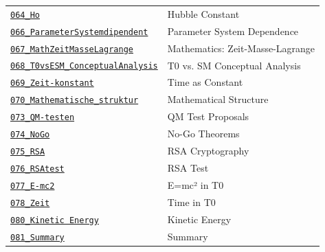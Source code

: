 {\begin{longtable}{@{}>{\raggedright\arraybackslash}p{} >{\raggedright\arraybackslash}p{}@{}}
\href{https://github.com/jpascher/T0-Time-Mass-Duality/blob/main/2/pdf/064_Ho_De.pdf}{\texttt{064\_Ho}} & Hubble Constant \\
\href{https://github.com/jpascher/T0-Time-Mass-Duality/blob/main/2/pdf/066_ParameterSystemdipendent_De.pdf}{\texttt{066\_ParameterSystemdipendent}} & Parameter System Dependence \\
\href{https://github.com/jpascher/T0-Time-Mass-Duality/blob/main/2/pdf/067_MathZeitMasseLagrange_De.pdf}{\texttt{067\_MathZeitMasseLagrange}} & Mathematics: Zeit-Masse-Lagrange \\
\href{https://github.com/jpascher/T0-Time-Mass-Duality/blob/main/2/pdf/068_T0vsESM_ConceptualAnalysis_De.pdf}{\texttt{068\_T0vsESM\_ConceptualAnalysis}} & T0 vs. SM Conceptual Analysis \\
\href{https://github.com/jpascher/T0-Time-Mass-Duality/blob/main/2/pdf/069_Zeit-konstant_De.pdf}{\texttt{069\_Zeit-konstant}} & Time as Constant \\
\href{https://github.com/jpascher/T0-Time-Mass-Duality/blob/main/2/pdf/070_Mathematische_struktur_De.pdf}{\texttt{070\_Mathematische\_struktur}} & Mathematical Structure \\
\href{https://github.com/jpascher/T0-Time-Mass-Duality/blob/main/2/pdf/073_QM-testen_De.pdf}{\texttt{073\_QM-testen}} & QM Test Proposals \\
\href{https://github.com/jpascher/T0-Time-Mass-Duality/blob/main/2/pdf/074_NoGo_De.pdf}{\texttt{074\_NoGo}} & No-Go Theorems \\
\href{https://github.com/jpascher/T0-Time-Mass-Duality/blob/main/2/pdf/075_RSA_De.pdf}{\texttt{075\_RSA}} & RSA Cryptography \\
\href{https://github.com/jpascher/T0-Time-Mass-Duality/blob/main/2/pdf/076_RSAtest_De.pdf}{\texttt{076\_RSAtest}} & RSA Test \\
\href{https://github.com/jpascher/T0-Time-Mass-Duality/blob/main/2/pdf/077_E-mc2_De.pdf}{\texttt{077\_E-mc2}} & E=mc² in T0 \\
\href{https://github.com/jpascher/T0-Time-Mass-Duality/blob/main/2/pdf/078_Zeit_De.pdf}{\texttt{078\_Zeit}} & Time in T0 \\
\href{https://github.com/jpascher/T0-Time-Mass-Duality/blob/main/2/pdf/080_Kinetic Energy_De.pdf}{\texttt{080\_Kinetic Energy}} & Kinetic Energy \\
\href{https://github.com/jpascher/T0-Time-Mass-Duality/blob/main/2/pdf/081_Summary_De.pdf}{\texttt{081\_Summary}} & Summary \\

\end{longtable}}
